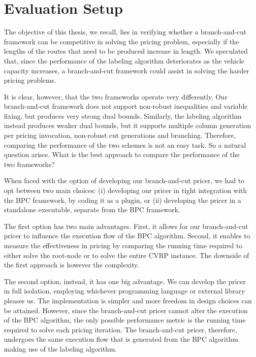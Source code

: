 \section{Evaluation Setup}
\label{sec:results-evaluation-setup}

The objective of this thesis, we recall, lies in verifying
whether a branch-and-cut framework can be competitive in solving
the pricing problem, especially if the lengths of the routes
that need to be produced increase in length.
We speculated that,
since the performance of the labeling algorithm deteriorates as the vehicle capacity increases,
a branch-and-cut framework could assist in solving the harder pricing problems.

It is clear, however, that the two frameworks operate very differently.
Our branch-and-cut framework does not support non-robust inequalities and variable fixing,
but produces very strong dual bounds.
Similarly, the labeling algorithm instead produces weaker dual bounds,
but it supports multiple column generation per pricing invocation,
non-robust cut generations and branching.
Therefore, comparing the performance of the two schemes is not an easy task.
So a natural question arises.
What is the best approach to compare the performance of the two frameworks?

\medskip

When faced with the option of developing our branch-and-cut pricer,
we had to opt between two main choices:
(i) developing our pricer in tight integration with the BPC framework,
by coding it as a \bapcod{} plugin,
or (ii) developing the pricer in a standalone executable,
separate from the BPC framework.

The first option has two main advantages.
First, it allows for our branch-and-cut pricer to influence the execution flow of the BPC algorithm.
Second, it enables to measure the effectiveness in pricing by comparing
the running time required to either solve the root-node or to solve the entire CVRP instance.
The downside of the first approach is however the complexity.

The second option, instead, it has one big advantage.
We can develop the pricer in full isolation, employing whichever programming
language or external library pleases us.
The implementation is simpler and more freedom in design choices can be attained.
However, since the branch-and-cut pricer cannot alter the execution of the BPC algorithm,
the only possible performance metric is the running time required to solve
each pricing iteration.
The branch-and-cut pricer, therefore, undergoes
the same execution flow that is generated from the BPC algorithm making use of the labeling algorithm.

